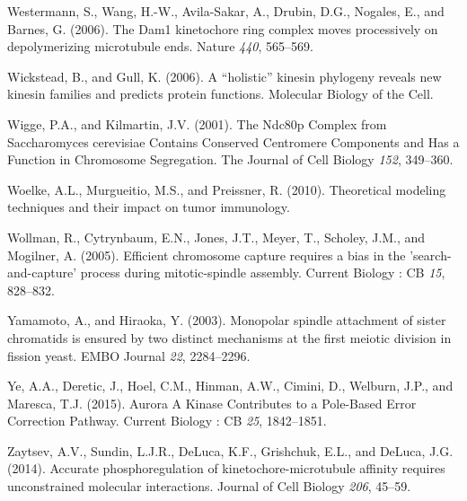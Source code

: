 \documentclass[12pt,a4paper,twoside,openright]{book}
\begin{document}
Westermann, S., Wang, H.-W., Avila-Sakar, A., Drubin, D.G., Nogales, E.,
and Barnes, G. (2006). The Dam1 kinetochore ring complex moves
processively on depolymerizing microtubule ends. Nature \emph{440},
565--569.

Wickstead, B., and Gull, K. (2006). A ``holistic'' kinesin phylogeny
reveals new kinesin families and predicts protein functions. Molecular
Biology of the Cell.

Wigge, P.A., and Kilmartin, J.V. (2001). The Ndc80p Complex from
Saccharomyces cerevisiae Contains Conserved Centromere Components and
Has a Function in Chromosome Segregation. The Journal of Cell Biology
\emph{152}, 349--360.

Woelke, A.L., Murgueitio, M.S., and Preissner, R. (2010). Theoretical
modeling techniques and their impact on tumor immunology.

Wollman, R., Cytrynbaum, E.N., Jones, J.T., Meyer, T., Scholey, J.M.,
and Mogilner, A. (2005). Efficient chromosome capture requires a bias in
the 'search-and-capture' process during mitotic-spindle assembly.
Current Biology : CB \emph{15}, 828--832.

Yamamoto, A., and Hiraoka, Y. (2003). Monopolar spindle attachment of
sister chromatids is ensured by two distinct mechanisms at the first
meiotic division in fission yeast. EMBO Journal \emph{22}, 2284--2296.

Ye, A.A., Deretic, J., Hoel, C.M., Hinman, A.W., Cimini, D., Welburn,
J.P., and Maresca, T.J. (2015). Aurora A Kinase Contributes to a
Pole-Based Error Correction Pathway. Current Biology : CB \emph{25},
1842--1851.

Zaytsev, A.V., Sundin, L.J.R., DeLuca, K.F., Grishchuk, E.L., and
DeLuca, J.G. (2014). Accurate phosphoregulation of
kinetochore-microtubule affinity requires unconstrained molecular
interactions. Journal of Cell Biology \emph{206}, 45--59.
\end{document}
